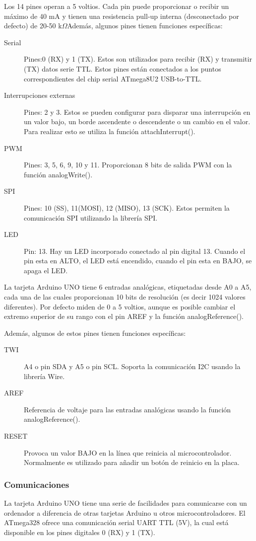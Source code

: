 Los 14 pines operan a 5 voltios. Cada pin puede proporcionar o recibir un máximo de 40 mA y tienen una resistencia pull-up interna (desconectado por defecto) de 20-50 k\(\Omega\)Además, algunos pines tienen funciones específicas:
\begin{description}
\item[Serial] Pines:0 (RX) y 1 (TX). Estos son utilizados para recibir (RX) y transmitir (TX) datos serie TTL. Estos pines están conectados a los puntos correspondientes del chip serial ATmega8U2 USB-to-TTL.
\item[Interrupciones externas] Pines: 2 y 3. Estos se pueden configurar para disparar una interrupción en un valor bajo, un borde ascendente o descendente o un cambio en el valor. Para realizar esto se utiliza la función attachInterrupt().
\item[PWM] Pines: 3, 5, 6, 9, 10 y 11. Proporcionan 8 bits de salida PWM con la función analogWrite().
\item [SPI] Pines: 10 (SS), 11(MOSI), 12 (MISO), 13 (SCK). Estos permiten la comunicación SPI utilizando la librería SPI.
\item [LED] Pin: 13. Hay un LED incorporado conectado al pin digital 13. Cuando el pin esta en ALTO, el LED está encendido, cuando el pin esta en BAJO, se apaga el LED.
\end{description}



La tarjeta Arduino UNO tiene 6 entradas analógicas, etiquetadas desde A0 a A5, cada una de las cuales proporcionan 10 bits de resolución (es decir 1024 valores diferentes). Por defecto miden de 0 a 5 voltios, aunque es posible cambiar el extremo superior de su rango con el pin AREF y la función analogReference(). 

Además, algunos de estos pines tienen funciones específicas:
\begin{description}
\item [TWI] A4 o pin SDA y A5 o pin SCL. Soporta la comunicación I2C usando la librería Wire.
\item [AREF] Referencia de voltaje para las entradas analógicas usando la función analogReference().
\item [RESET] Provoca un valor BAJO en la línea que reinicia al microcontrolador. Normalmente es utilizado para añadir un botón de reinicio en la placa.
\end{description}


\subsubsection{Comunicaciones}
La tarjeta Arduino UNO tiene una serie de facilidades para comunicarse con un ordenador a diferencia de otras tarjetas Arduino u otros microcontroladores. El ATmega328 ofrece una comunicación serial UART TTL (5V), la cual está disponible en los pines digitales 0 (RX) y 1 (TX). 



